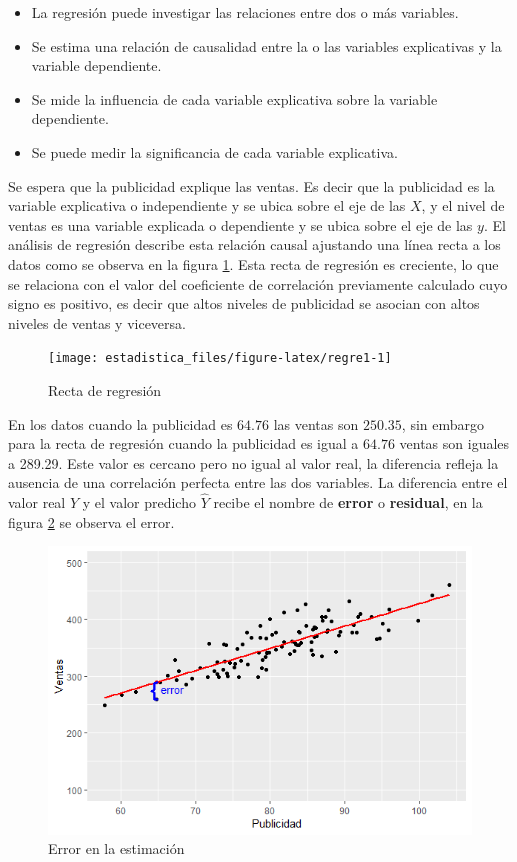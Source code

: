 \documentclass[]{book}
\providecommand{\tightlist}{%
  \setlength{\itemsep}{0pt}\setlength{\parskip}{0pt}}
\begin{document}
\begin{itemize}
\tightlist
\item
  La regresión puede investigar las relaciones entre dos o más variables.
\item
  Se estima una relación de causalidad entre la o las variables explicativas y la variable dependiente.
\item
  Se mide la influencia de cada variable explicativa sobre la variable dependiente.
\item
  Se puede medir la significancia de cada variable explicativa.
\end{itemize}

Se espera que la publicidad explique las ventas. Es decir que la publicidad es la variable explicativa o independiente y se ubica sobre el eje de las \(X\), y el nivel de ventas es una variable explicada o dependiente y se ubica sobre el eje de las \(y\). El análisis de regresión describe esta relación causal ajustando una línea recta a los datos como se observa en la figura \ref{fig:regre1}. Esta recta de regresión es creciente, lo que se relaciona con el valor del coeficiente de correlación previamente calculado cuyo signo es positivo, es decir que altos niveles de publicidad se asocian con altos niveles de ventas y viceversa.

\begin{figure}[h]

{\centering \texttt{[image: estadistica\_files/figure-latex/regre1-1]} 

}

\caption{Recta de regresión}\label{fig:regre1}
\end{figure}

En los datos cuando la publicidad es \(64.76\) las ventas son \(250.35\), sin embargo para la recta de regresión cuando la publicidad es igual a \(64.76\) ventas son iguales a 289.29. Este valor es cercano pero no igual al valor real, la diferencia refleja la ausencia de una correlación perfecta entre las dos variables. La diferencia entre el valor real \(Y\) y el valor predicho \(\hat{Y}\) recibe el nombre de \textbf{error} o \textbf{residual}, en la figura \ref{fig:error1} se observa el error.

\begin{figure}[h]

{\centering \includegraphics[width=0.6\linewidth]{error} 

}

\caption{Error en la estimación}\label{fig:error1}
\end{figure}
\end{document}
